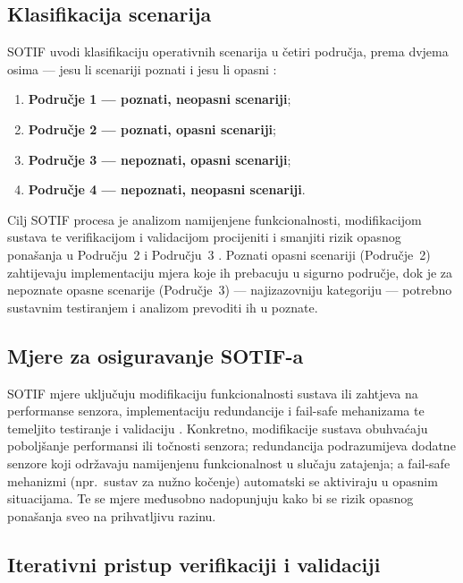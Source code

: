 \subsection{Klasifikacija scenarija}

SOTIF uvodi klasifikaciju operativnih scenarija u četiri područja, prema dvjema osima — jesu li scenariji poznati i jesu li opasni \cite{patel2025sotifslr, iso21448}:

\begin{enumerate}
  \item \textbf{Područje 1 — poznati, neopasni scenariji};
  \item \textbf{Područje 2 — poznati, opasni scenariji};
  \item \textbf{Područje 3 — nepoznati, opasni scenariji};
  \item \textbf{Područje 4 — nepoznati, neopasni scenariji}.
\end{enumerate}

Cilj SOTIF procesa je analizom namijenjene funkcionalnosti, modifikacijom sustava te verifikacijom i validacijom procijeniti i smanjiti rizik opasnog ponašanja u Području~2 i Području~3 \cite{patel2025sotifslr}. Poznati opasni scenariji (Područje~2) zahtijevaju implementaciju mjera koje ih prebacuju u sigurno područje, dok je za nepoznate opasne scenarije (Područje~3) — najizazovniju kategoriju — potrebno sustavnim testiranjem i analizom prevoditi ih u poznate.

\subsection{Mjere za osiguravanje SOTIF-a}

SOTIF mjere uključuju modifikaciju funkcionalnosti sustava ili zahtjeva na performanse senzora, implementaciju redundancije i fail-safe mehanizama te temeljito testiranje i validaciju \cite{patel2025sotifslr}. Konkretno, modifikacije sustava obuhvaćaju poboljšanje performansi ili točnosti senzora; redundancija podrazumijeva dodatne senzore koji održavaju namijenjenu funkcionalnost u slučaju zatajenja; a fail-safe mehanizmi (npr.\ sustav za nužno kočenje) automatski se aktiviraju u opasnim situacijama. Te se mjere međusobno nadopunjuju kako bi se rizik opasnog ponašanja sveo na prihvatljivu razinu.

\subsection{Iterativni pristup verifikaciji i validaciji}


